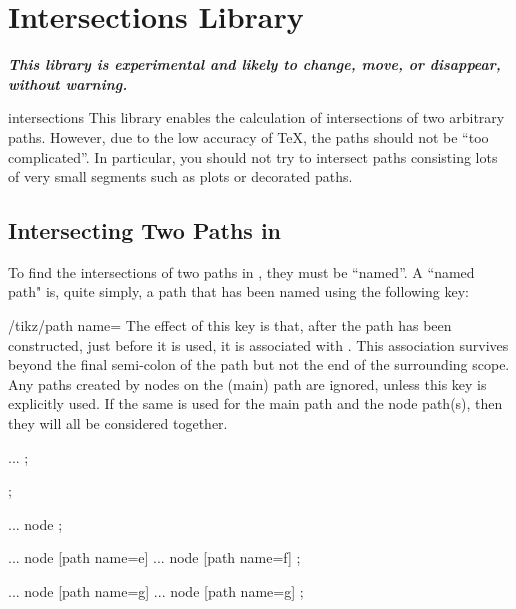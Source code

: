 %
%
%


\section{Intersections Library}

{\bf\emph{This library is experimental and likely to change,
move, or disappear, without warning.}}

\begin{pgflibrary}{intersections}
  This library enables the calculation of intersections of
  two arbitrary paths. However, due to the low accuracy of
  \TeX, the paths should not be ``too complicated''.
  In particular, you should not try to intersect paths consisting 
  lots of very small segments such as plots or decorated paths.
\end{pgflibrary}

\subsection{Intersecting Two Paths in \tikzname}

  To find the intersections of two paths in \tikzname, they must be
  ``named''. A ``named path" is, quite simply, a path that has been 
  named using the following key:
  
\begin{key}{/tikz/path name=}
	The effect of this key is that, after the path has been constructed, 
	just before it is used, it is associated with . This 
	association survives beyond the final semi-colon of the path 
	but not the end of the surrounding scope. Any paths created by
	nodes on the (main) path are ignored, unless this key is explicitly 
	used. If the same  is used for the main path and the
	node path(s), then they will all be considered together.
	
	
\begin{codeexample}
\begin{scope}
  \path [path name=a] ... ;       %
  
  \node [path name=b] {};         %
  
  \path [path name=c]  ...        %
    node {};                      %
  
  \path [path name=d] ...         %
    node [path name=e] {} ...     %
    node [path name=f] {};        %
                                                        
  \path [path name=g] ...
    node [path name=g] {}...
    node [path name=g] {};        %
\end{scope}


\end{codeexample}
\end{key}

